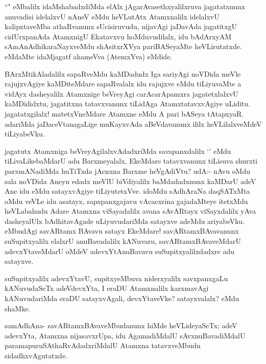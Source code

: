 \begin{artha}%
``\stext " eMbalilx idaMshabadxdiMda elAlx jAgarAvasethxyalilxruva jagatatxnunx anuvadisi idelalxvU nAneV eMdu heVLutAtx Atamxnalilx idelalxvU kalipxtaveMba athaRvanunx sUcisiruvudu, nijavAgi jaDavAda jagatitxgU cidUrxpanAda AtamxnigU Ekatavxvu hoMduvudilalx, idu bAdArxyAM sAmAnAdhikaraNayxveMdu shAsitxrXVya pariBASeyaMte heVLirutatxde. \stext eMdaMte idaMjagatf ahameVva (AtemxYva) eMdide.
\end{artha}

\begin{artha}
BArxMtikAladalilx sapaRveMdu kaMDadudx Iga sariyAgi noVDida meVle rajujxvAgiye kaMDiteMdare sapaRvalalx idu rajujxve eMdu tiLiyuvaMte a vidAyx dasheyalilx Atamxnige beVreyAgi carAcarApamxra jagatetxlalxvU kaMDididxtu, jagatitxna tatavxvanunx tiLidAga AtamxtatavxvAgiye uLiditu. jagatatxgilalx! matetxVneMdare Atamxne eMdu A pari bASeya tAtapxyaR. adariMda jaDaceVtanagaLige muKayxvAda aBeVdavanunx ililx heVLilalxveMdeV tiLiyabeVku. 
\end{artha}

\begin{artha}
jagatutx Atamxniga beVreyAgilalxvAdadxriMda savapanxdalilx `\stext' eMdu tiLivaLikebaMdarU adu Barxmeyalalx, EkeMdare tatavxvanunx tiLisuva shurxti parxmANadiMda huTiTxda jAcnxna Barxme heVgAdiVtu? udA:- nAvu oMdu sala noVDida Aneyu edadx meVlU biVdiyalilx baMdadadxnunx kaMDarU adeV Ane idu eMdu satayxvAgiye tiLiyutetxVve. idoMdu sAdhAraNa daqSATxMta oMdu veVLe idu asatayx, sapxpanxgajavu vAcacxrina gajadaMteye itetxMdu heVLabahudu Adare Atamxna viSayadalilx avana sAvARtayx viSayxdalilx yAva dasheyalUlx bAdhitavAgade uLiyuvudariMda satayxve adeMdu ariyabeVku. \stext eMbudAgi savARtamx BAvavu satayx EkeMdare! savARtamxBAvavanunx suSupitxyalilx elalxrU anuBavadalilx kANuvaru, savARtamxBAvaveMdarU adevxYtaveMdarU oMdeV adevxYtAnuBavavu suSupitxyalilxdadxre adu satayxve. 
\end{artha}


\begin{artha}
suSupitxyalilx adevxYtavU, supitxyeMbuva niderxyalilx savxpanxgaLu kANuvudaSeTx adeVdevxYta, I eraDU Atamxnalilx karxmavAgi kANuvudariMda eraDU satayxvAgali, devxYtaveVke? satayxvalalx? eMdu shaMke. 
\end{artha}

\begin{artha}
samAdhAna- savARtamxBAvaveMbudanunx hiMde heVLideyaSeTx; adeV adevxYta, Atamxna nijasavxrUpa, idu AgamadiMdalU sAvxnuBavadiMdalU paramapuruSAthaRvAdadxriMdalU Atamxna tatavxveMbudu sidadhxvAgutatxde. 
\end{artha}

